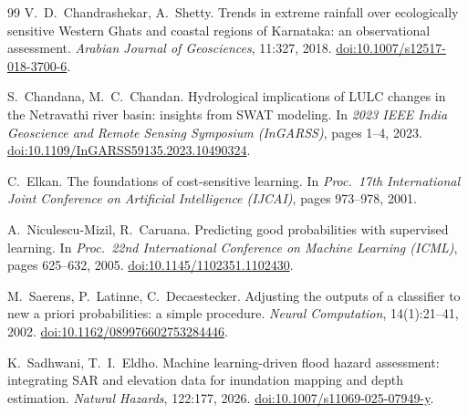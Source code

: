\documentclass[11pt,a4paper]{article}
\begin{document}
\begin{thebibliography}{99}
V.~D.~Chandrashekar, A.~Shetty.
Trends in extreme rainfall over ecologically sensitive Western Ghats and coastal
regions of Karnataka: an observational assessment.
\emph{Arabian Journal of Geosciences}, 11:327, 2018.
\href{https://doi.org/10.1007/s12517-018-3700-6}{doi:10.1007/s12517-018-3700-6}.

S.~Chandana, M.~C.~Chandan.
Hydrological implications of LULC changes in the Netravathi river basin:
insights from SWAT modeling.
In \emph{2023 IEEE India Geoscience and Remote Sensing Symposium (InGARSS)},
pages 1--4, 2023.
\href{https://doi.org/10.1109/InGARSS59135.2023.10490324}{doi:10.1109/InGARSS59135.2023.10490324}.

C.~Elkan.
The foundations of cost-sensitive learning.
In \emph{Proc.\ 17th International Joint Conference on Artificial Intelligence
(IJCAI)}, pages 973--978, 2001.

A.~Niculescu-Mizil, R.~Caruana.
Predicting good probabilities with supervised learning.
In \emph{Proc.\ 22nd International Conference on Machine Learning (ICML)},
pages 625--632, 2005.
\href{https://doi.org/10.1145/1102351.1102430}{doi:10.1145/1102351.1102430}.

M.~Saerens, P.~Latinne, C.~Decaestecker.
Adjusting the outputs of a classifier to new a priori probabilities: a simple
procedure.
\emph{Neural Computation}, 14(1):21--41, 2002.
\href{https://doi.org/10.1162/089976602753284446}{doi:10.1162/089976602753284446}.

K.~Sadhwani, T.~I.~Eldho.
Machine learning-driven flood hazard assessment: integrating SAR and elevation
data for inundation mapping and depth estimation.
\emph{Natural Hazards}, 122:177, 2026.
\href{https://doi.org/10.1007/s11069-025-07949-y}{doi:10.1007/s11069-025-07949-y}.

\end{thebibliography}
\end{document}
